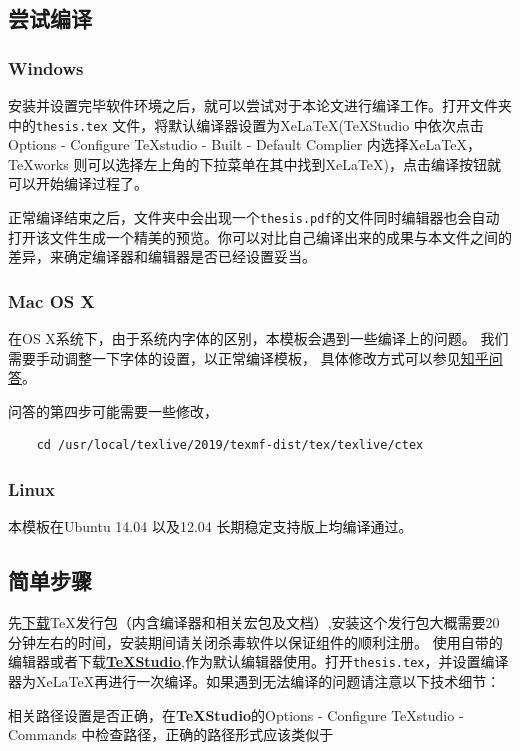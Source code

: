 \subsection{尝试编译}
\subsubsection{Windows}
安装并设置完毕软件环境之后，就可以尝试对于本论文进行编译工作。打开文件夹中的\verb|thesis.tex| 文件，将默认编译器设置为Xe\LaTeX(\TeX Studio 中依次点击Options - Configure TeXstudio - Built - Default Complier 内选择Xe\LaTeX ，\TeX works 则可以选择左上角的下拉菜单在其中找到Xe\LaTeX )，点击编译按钮就可以开始编译过程了。

正常编译结束之后，文件夹中会出现一个\verb|thesis.pdf|的文件同时编辑器也会自动打开该文件生成一个精美的预览。你可以对比自己编译出来的成果与本文件之间的差异，来确定编译器和编辑器是否已经设置妥当。
\subsubsection{Mac OS X}

在OS X系统下，由于系统内字体的区别，本模板会遇到一些编译上的问题。 我们需要手动调整一下字体的设置，以正常编译模板， 具体修改方式可以参见\href{http://www.zhihu.com/question/22906637}{知乎问答}。

问答的第四步可能需要一些修改，
\begin{verbatim}
	cd /usr/local/texlive/2019/texmf-dist/tex/texlive/ctex
\end{verbatim}

\subsubsection{Linux}
本模板在Ubuntu 14.04 以及12.04 长期稳定支持版上均编译通过。

\subsection{简单步骤}
先\href{https://www.tug.org/texlive/acquire-iso.html}{下载}\TeX 发行包（内含编译器和相关宏包及文档）,安装这个发行包大概需要20分钟左右的时间，安装期间请关闭杀毒软件以保证组件的顺利注册。
使用自带的编辑器或者下载\href{http://texstudio.sourceforge.net/}{\textbf{\TeX Studio}},作为默认编辑器使用。打开\verb|thesis.tex|，并设置编译器为Xe\LaTeX 再进行一次编译。如果遇到无法编译的问题请注意以下技术细节：

相关路径设置是否正确，在\textbf{\TeX Studio}的Options - Configure TeXstudio - Commands 中检查路径，正确的路径\cite{谢琪-203}形式应该类似于

